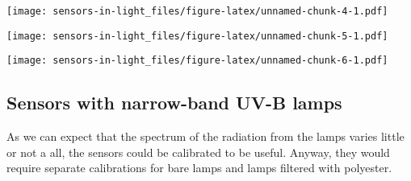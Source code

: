 \documentclass[
]{article}
\newenvironment{Shaded}{\begin{snugshade}}{\end{snugshade}}
\newcommand{\AttributeTok}[1]{\textcolor[rgb]{0.77,0.63,0.00}{#1}}
\newcommand{\DecValTok}[1]{\textcolor[rgb]{0.00,0.00,0.81}{#1}}
\newcommand{\FloatTok}[1]{\textcolor[rgb]{0.00,0.00,0.81}{#1}}
\newcommand{\FunctionTok}[1]{\textcolor[rgb]{0.00,0.00,0.00}{#1}}
\newcommand{\NormalTok}[1]{#1}
\newcommand{\SpecialCharTok}[1]{\textcolor[rgb]{0.00,0.00,0.00}{#1}}
\newcommand{\StringTok}[1]{\textcolor[rgb]{0.31,0.60,0.02}{#1}}
\begin{document}
\texttt{[image: sensors-in-light\_files/figure-latex/unnamed-chunk-4-1.pdf]}

\begin{Shaded}
\end{Shaded}

\texttt{[image: sensors-in-light\_files/figure-latex/unnamed-chunk-5-1.pdf]}

\begin{Shaded}
\end{Shaded}

\texttt{[image: sensors-in-light\_files/figure-latex/unnamed-chunk-6-1.pdf]}

\hypertarget{sensors-with-narrow-band-uv-b-lamps}{%
\subsection{Sensors with narrow-band UV-B
lamps}\label{sensors-with-narrow-band-uv-b-lamps}}

As we can expect that the spectrum of the radiation from the lamps
varies little or not a all, the sensors could be calibrated to be
useful. Anyway, they would require separate calibrations for bare lamps
and lamps filtered with polyester.
\end{document}
